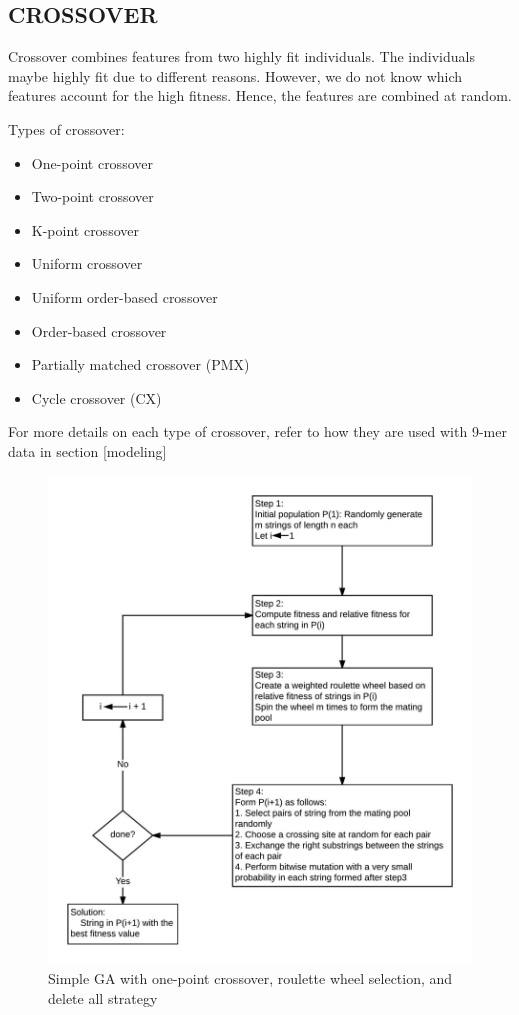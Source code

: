 \documentclass[12pt,a4paper]{article}
\begin{document}
	\subsection{CROSSOVER}
	Crossover combines features from two highly fit individuals. The individuals maybe highly fit due to different reasons. However, we do not know which features account for the high fitness. Hence, the features are combined at random. \par
	Types of crossover:
	\begin{itemize}
	\item One-point crossover
	\item Two-point crossover
	\item K-point crossover
	\item Uniform crossover
	\item Uniform order-based crossover
	\item Order-based crossover
	\item Partially matched crossover (PMX)
	\item Cycle crossover (CX)
	\end{itemize}

	For more details on each type of crossover, refer to how they are used with 9-mer data in section [modeling]

	\begin{figure}[H]
		\includegraphics[width=\textwidth,height=\textheight]{"GA-block2-algo"}
		\caption{Simple GA with one-point crossover, roulette wheel selection, and delete all strategy}
		\centering
	\end{figure}
\end{document}

